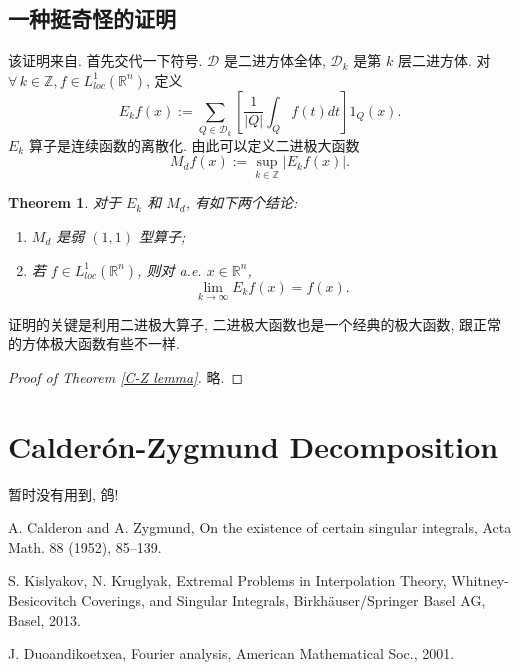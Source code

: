\documentclass[a4paper,11pt]{article}
\newtheorem{theorem}{Theorem}[section]
\theoremstyle{definition}
\begin{document}
\begin{CJK*}{UTF8}{gbsn}
\subsection{一种挺奇怪的证明}

该证明来自\cite[Theorem 2.11]{d01}.
首先交代一下符号. $ \mathcal{D} $ 是二进方体全体, $ \mathcal{D}_k $ 是第 $ k $ 层二进方体. 
对 $ \forall \, k \in \mathbb{Z}, f \in L^1_{loc}(\mathbb{R}^n) $, 定义
$$
    E_k f (x) := \sum_{Q \in \mathcal{D}_k} \left[ \frac{1}{|Q|} \int_{Q} f(t) dt \right] \mathrm{1}_Q (x).
$$
$ E_k $ 算子是连续函数的离散化. 由此可以定义二进极大函数
$$
    M_d f(x) := \sup_{k \in \mathbb{Z}} |E_k f (x)|.
$$

\begin{theorem} \label{thm} 
    对于 $ E_k $ 和 $ M_d $, 有如下两个结论:
    \begin{enumerate}[{\rm(i)}]
        \item $ M_d $ 是弱 $ (1, 1) $ 型算子;
        \item 若 $ f \in L^1_{loc}(\mathbb{R}^n) $, 则对 a.e. $ x \in \mathbb{R}^n $,
        $$
            \lim_{k \to \infty} E_k f (x) = f(x).
        $$
    \end{enumerate}
\end{theorem}

证明的关键是利用二进极大算子, 二进极大函数也是一个经典的极大函数, 跟正常的方体极大函数有些不一样.

\begin{proof}[Proof of Theorem \ref{C-Z lemma}]
    略.
\end{proof}

\section{Calder\'on-Zygmund Decomposition}

暂时没有用到, 鸽!

\begin{thebibliography}{99}

     A. Calderon and A. Zygmund, On the existence of certain singular integrals, 
        Acta Math. 88 (1952), 85--139.
        
     S. Kislyakov, N. Kruglyak,
    Extremal Problems in Interpolation Theory, Whitney-Besicovitch Coverings, and Singular Integrals,
    Birkh\"{a}user/Springer Basel AG, Basel, 2013.
    
     J. Duoandikoetxea, Fourier analysis, American Mathematical Soc., 2001.
    
\end{thebibliography}

\end{CJK*}
\end{document}
